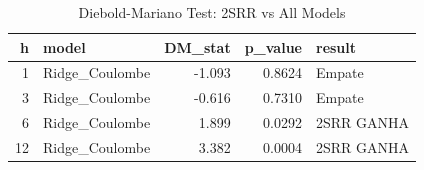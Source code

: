 \begin{table}[ht]
\centering
\caption{Diebold-Mariano Test: 2SRR vs All Models} 
\label{tab:dm_test}
\begin{tabular}{rlrrl}
  \toprule
h & model & DM\_stat & p\_value & result \\ 
  \midrule
1 & Ridge\_Coulombe & -1.093 & 0.8624 & Empate \\ 
  3 & Ridge\_Coulombe & -0.616 & 0.7310 & Empate \\ 
  6 & Ridge\_Coulombe & 1.899 & 0.0292 & 2SRR GANHA \\ 
  12 & Ridge\_Coulombe & 3.382 & 0.0004 & 2SRR GANHA \\ 
   \bottomrule
\end{tabular}
\end{table}
